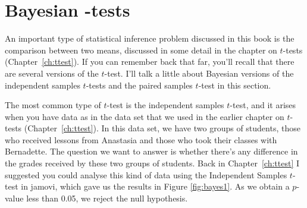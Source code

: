 \begin{comment}
Finally, if we turn to hypergeometric sampling in which everything is fixed, we get...
\begin{rblock1}
> @usr{contingencyTableBF(crosstab, sampleType = "hypergeom")}
Error in contingencyHypergeometric(as.matrix(data2), a) : 
  hypergeometric contingency tables restricted to 2 x 2 tables; see help for contingencyTableBF()
\end{rblock1}
... an error message. Okay, some quick reading through the help files hints that support for larger contingency tables is coming, but it's not been implemented yet. In the meantime, let's imagine we have data from the ``toy labelling'' experiment I described earlier in this section. Specifically, let's say our data look like this:
\begin{rblock1}
> @usr{toys}
     pink blue
girl    8    2
boy     2    8
\end{rblock1}
The Bayesian test with hypergeometric sampling gives us this:
\begin{rblock1}
> @usr{contingencyTableBF(toys, sampleType = "hypergeom")}
Bayes factor analysis
--------------
[1] Non-indep. (a=1) : 8.294321 @plusorminus0%

Against denominator:
  Null, independence, a = 1 
---
Bayes factor type: BFcontingencyTable, hypergeometric
\end{rblock1}
The Bayes factor of 8:1 provides modest evidence that the labels were being assigned in a way that correlates gender with colour, but it's not conclusive.



\end{comment}


\section{Bayesian \texorpdfstring{}{}-tests\label{sec:ttestbf}}

An important type of statistical inference problem discussed in this book is the comparison between two means, discussed in some detail in the chapter on $t$-tests (Chapter~\ref{ch:ttest}). If you can remember back that far, you'll recall that there are several versions of the $t$-test. I'll talk a little about Bayesian versions of the independent samples $t$-tests and the paired samples $t$-test in this section. 


The most common type of $t$-test is the independent samples $t$-test, and it arises when you have data as in the  data set that we used in the earlier chapter on $t$-tests (Chapter~\ref{ch:ttest}). In this data set, we have two groups of students, those who received lessons from Anastasia and those who took their classes with Bernadette. The question we want to answer is whether there's any difference in the grades received by these two groups of students. Back in Chapter~\ref{ch:ttest} I suggested you could analyse this kind of data using the Independent Samples $t$-test in jamovi, which gave us the results in Figure \ref{fig:bayes1}. As we obtain a $p$-value less than 0.05, we reject the null hypothesis. 

